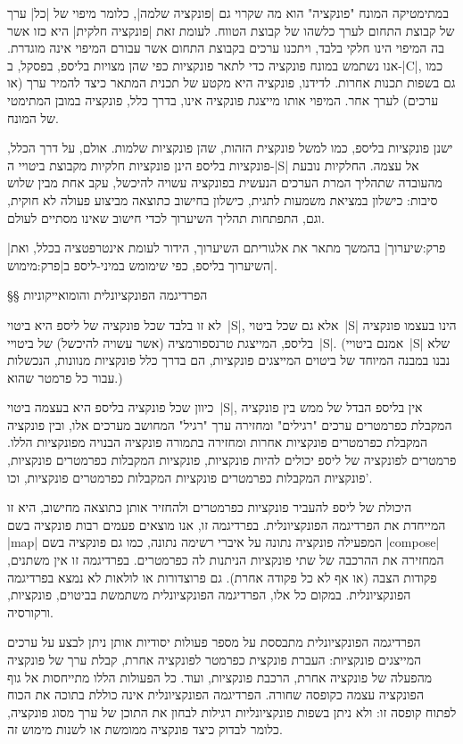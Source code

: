 במתימטיקה המונח "פונקציה" הוא מה שקרוי גם \ע|פונקציה שלמה|, כלומר מיפוי של
\ע|כל| ערך של קבוצת התחום לערך כלשהו של קבוצת הטווח. לעומת זאת \ע|פונקציה
חלקית| היא כזו אשר בה המיפוי הינו חלקי בלבד, ויתכנו ערכים בקבוצת התחום אשר
עבורם המיפוי אינה מוגדרת. אנו נשתמש במונח פונקציה כדי לתאר פונקציות כפי שהן
מצויות בליספ, בפסקל, ב-\E|C|, כמו גם בשפות תכנות אחרות. לדידנו, פונקציה היא
מקטע של תכנית המתאר כיצד להמיר ערך (או ערכים) לערך אחר. המיפוי אותו מייצגת
פונקציה אינו, בדרך כלל, פונקציה במובן המתימטי של המונח.

ישנן פונקציות בליספ, כמו למשל פונקצית הזהות, שהן פונקציות שלמות. אולם, על דרך
הכלל, פונקציות בליספ הינן פונקציות חלקיות מקבוצת ביטויי ה-\E|S| אל עצמה.
החלקיות נובעת מהעובדה שתהליך המרת הערכים הנעשית בפונקציה עשויה להיכשל, עקב אחת
מבין שלוש סיבות: כישלון במציאת משמעות לתגית, כישלון בחישוב כתוצאה מביצוע פעולה
לא חוקית, וגם, התפתחות תהליך השיערוך לכדי חישוב שאינו מסתיים לעולם.

|פרק:שיערוך| בהמשך מתאר את אלגוריתם השיערוך, הידור לעומת אינטרפטציה בכלל,
ואת השיערוך בליספ, כפי שימומש במיני-ליספ ב|פרק:מימוש|.

§§ הפרדיגמה הפונקציונלית והומואייקוניות

לא זו בלבד שכל פונקציה של ליספ היא ביטוי~\E|S|, אלא גם שכל ביטוי~\E|S| הינו
בעצמו פונקציה בליספ, המייצגת טרנספורמציה (אשר עשויה להיכשל) של ביטויי~\E|S|.
(אמנם ביטויי~\E|S| שלא נבנו במבנה המיוחד של ביטוים המייצגים פונקציות, הם בדרך
כלל פונקציות מנוונות, הנכשלות עבור כל פרמטר שהוא.)

כיוון שכל פונקציה בליספ היא בעצמה ביטוי~\E|S|, אין בליספ הבדל של ממש בין
פונקציה המקבלת כפרמטרים ערכים "רגילים" ומחזירה ערך "רגיל" המחושב מערכים אלו,
ובין פונקציה המקבלת כפרמטרים פונקציות אחרות ומחזירה בתמורה פונקציה הבנויה
מפונקציות הללו. פרמטרים לפונקציה של ליספ יכולים להיות פונקציות, פונקציות
המקבלות כפרמטרים פונקציות, פונקציות המקבלות כפרמטרים פונקציות המקבלות כפרמטרים
פונקציות, וכו'.

היכולת של ליספ להעביר פונקציות כפרמטרים ולהחזיר אותן כתוצאה מחישוב, היא זו
המייחדת את הפרדיגמה הפונקציונלית. בפרדיגמה זו, אנו מוצאים פעמים רבות פונקציה
בשם \E|map| המפעילה פונקציה נתונה על איברי רשימה נתונה, כמו גם פונקציה בשם
\E|compose| המחזירה את ההרכבה של שתי פונקציות הניתנות לה כפרמטרים. בפרדיגמה זו
אין משתנים, פקודות הצבה (או אף לא כל פקודה אחרת). גם פרוצדורות או
לולאות לא נמצא בפרדיגמה הפונקציונלית. במקום כל אלו, הפרדיגמה הפונקציונלית
משתמשת בביטוים, פונקציות, ורקורסיה.

הפרדיגמה הפונקציונלית מתבססת על מספר פעולות יסודיות אותן ניתן לבצע על ערכים
המייצגים פונקציות: העברת פונקצית כפרמטר לפונקציה אחרת, קבלת ערך של פונקציה
מהפעלה של פונקציה אחרת, הרכבת פונקציות, ועוד. כל הפעולות הללו מתייחסות אל גוף
הפונקציה עצמה כקופסה שחורה. הפרדיגמה הפונקציונלית אינה כוללת בתוכה את הכוח
לפתוח קופסה זו: ולא ניתן בשפות פונקציונליות רגילות לבחון את התוכן של ערך מסוג
פונקציה, כלומר לבדוק כיצד פונקציה ממומשת או לשנות מימוש זה.

